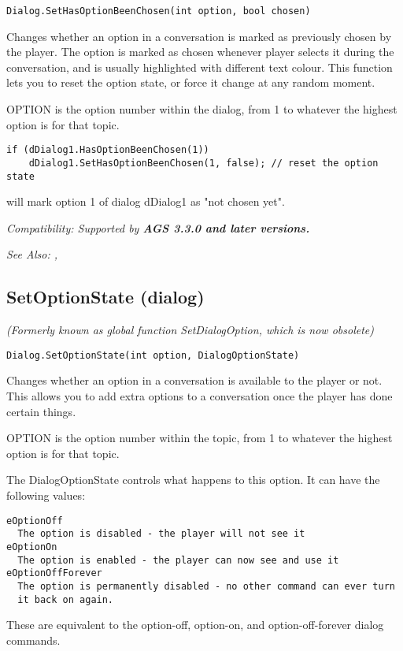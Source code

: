 \begin{verbatim}
Dialog.SetHasOptionBeenChosen(int option, bool chosen)
\end{verbatim}
Changes whether an option in a conversation is marked as previously chosen by the player. The option is marked as chosen whenever player selects it during the conversation, and is usually highlighted with different text colour. This function lets you to reset the option state, or force it change at any random moment.

OPTION is the option number within the dialog, from 1 to whatever the
highest option is for that topic.

\begin{verbatim}
if (dDialog1.HasOptionBeenChosen(1))
    dDialog1.SetHasOptionBeenChosen(1, false); // reset the option state
\end{verbatim}
will mark option 1 of dialog dDialog1 as "not chosen yet".

\it{Compatibility:} Supported by \bf{AGS 3.3.0} and later versions.

\it{See Also:} ,

\subsection{SetOptionState (dialog)}\label{Dialog.SetOptionState}%

\it{(Formerly known as global function SetDialogOption, which is now obsolete)}

\begin{verbatim}
Dialog.SetOptionState(int option, DialogOptionState)
\end{verbatim}
Changes whether an option in a conversation is available to the player or
not. This allows you to add extra options to a conversation once the player
has done certain things.

OPTION is the option number within the topic, from 1 to whatever the
highest option is for that topic.

The DialogOptionState controls what happens to this option. It can have the following
values:
\begin{verbatim}
eOptionOff
  The option is disabled - the player will not see it
eOptionOn
  The option is enabled - the player can now see and use it
eOptionOffForever
  The option is permanently disabled - no other command can ever turn
  it back on again.
\end{verbatim}
These are equivalent to the option-off, option-on, and option-off-forever
dialog commands.

